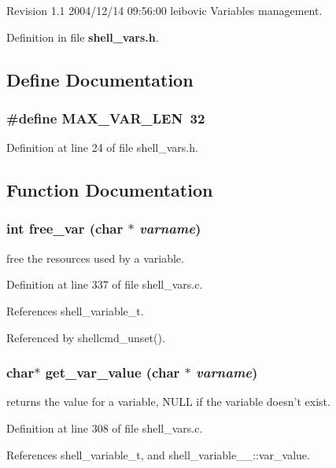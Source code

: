 Revision 1.1 2004/12/14 09:56:00 leibovic Variables management.

Definition in file {\bf shell\_\-vars.h}.

\subsection{Define Documentation}
\subsubsection{\setlength{\rightskip}{0pt plus 5cm}\#define MAX\_\-VAR\_\-LEN\ 32}\label{shell__vars_8h_a0}




Definition at line 24 of file shell\_\-vars.h.

\subsection{Function Documentation}
\subsubsection{\setlength{\rightskip}{0pt plus 5cm}int free\_\-var (char $\ast$ {\em varname})}\label{shell__vars_8h_a4}


free the resources used by a variable. 

Definition at line 337 of file shell\_\-vars.c.

References shell\_\-variable\_\-t.

Referenced by shellcmd\_\-unset().
\subsubsection{\setlength{\rightskip}{0pt plus 5cm}char$\ast$ get\_\-var\_\-value (char $\ast$ {\em varname})}\label{shell__vars_8h_a2}


returns the value for a variable, NULL if the variable doesn't exist. 

Definition at line 308 of file shell\_\-vars.c.

References shell\_\-variable\_\-t, and shell\_\-variable\_\-\_\-::var\_\-value.

